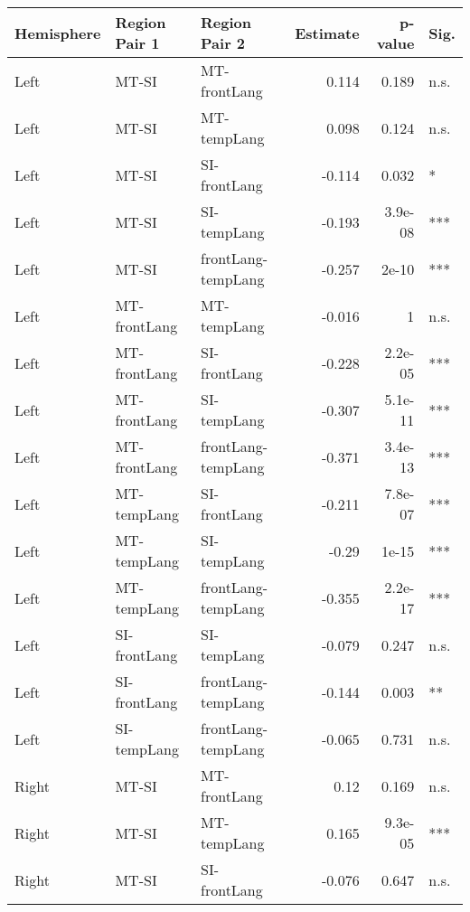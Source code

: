 \begin{table}[h]
\centering
\begin{tabular}{lllrrl}
\toprule
 Hemisphere   & Region Pair 1   & Region Pair 2      &   Estimate &   p-value & Sig.   \\
\midrule
 Left         & MT-SI           & MT-frontLang       &      0.114 &   0.189   & n.s.   \\
 Left         & MT-SI           & MT-tempLang        &      0.098 &   0.124   & n.s.   \\
 Left         & MT-SI           & SI-frontLang       &     -0.114 &   0.032   & *      \\
 Left         & MT-SI           & SI-tempLang        &     -0.193 &   3.9e-08 & ***    \\
 Left         & MT-SI           & frontLang-tempLang &     -0.257 &   2e-10   & ***    \\
 Left         & MT-frontLang    & MT-tempLang        &     -0.016 &   1       & n.s.   \\
 Left         & MT-frontLang    & SI-frontLang       &     -0.228 &   2.2e-05 & ***    \\
 Left         & MT-frontLang    & SI-tempLang        &     -0.307 &   5.1e-11 & ***    \\
 Left         & MT-frontLang    & frontLang-tempLang &     -0.371 &   3.4e-13 & ***    \\
 Left         & MT-tempLang     & SI-frontLang       &     -0.211 &   7.8e-07 & ***    \\
 Left         & MT-tempLang     & SI-tempLang        &     -0.29  &   1e-15   & ***    \\
 Left         & MT-tempLang     & frontLang-tempLang &     -0.355 &   2.2e-17 & ***    \\
 Left         & SI-frontLang    & SI-tempLang        &     -0.079 &   0.247   & n.s.   \\
 Left         & SI-frontLang    & frontLang-tempLang &     -0.144 &   0.003   & **     \\
 Left         & SI-tempLang     & frontLang-tempLang &     -0.065 &   0.731   & n.s.   \\
 Right        & MT-SI           & MT-frontLang       &      0.12  &   0.169   & n.s.   \\
 Right        & MT-SI           & MT-tempLang        &      0.165 &   9.3e-05 & ***    \\
 Right        & MT-SI           & SI-frontLang       &     -0.076 &   0.647   & n.s.   \\

\end{tabular}
\end{table}
